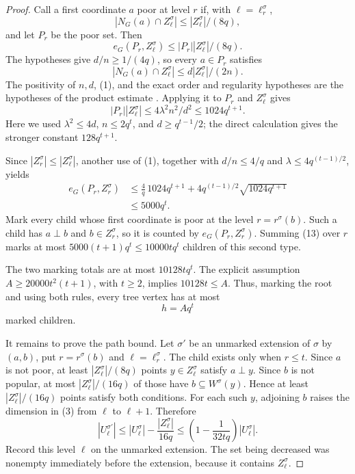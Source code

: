 \begin{proof}
Call a first coordinate $a$ poor at level $r$ if, with
$\ell=\ell_r^\sigma$,
\[
 |N_G(a)\cap Z_\ell^\sigma|
 \leq |Z_\ell^\sigma|/(8q),                                \tag{9}
\]
and let $P_r$ be the poor set.  Then
\[
 e_G(P_r,Z_\ell^\sigma)
 \leq |P_r||Z_\ell^\sigma|/(8q).                             \tag{10}
\]
The hypotheses give $d/n\geq1/(4q)$, so every $a\in P_r$ satisfies
\[
 |N_G(a)\cap Z_\ell^\sigma|
 \leq d|Z_\ell^\sigma|/(2n).                                \tag{11}
\]
The positivity of $n,d$, (1), and the exact order and regularity hypotheses
are the hypotheses of the product estimate .  Applying
it to $P_r$ and $Z_\ell^\sigma$ gives
\[
 |P_r||Z_\ell^\sigma|
 \leq4\lambda^2n^2/d^2\leq1024q^{t+1}.                     \tag{12}
\]
Here we used $\lambda^2\leq4d$, $n\leq2q^t$, and
$d\geq q^{t-1}/2$; the direct calculation gives the stronger constant
$128q^{t+1}$.

Since $|Z_r^\sigma|\leq|Z_\ell^\sigma|$, another use of (1), together with
$d/n\leq4/q$ and $\lambda\leq4q^{(t-1)/2}$, yields
\[
\begin{aligned}
 e_G(P_r,Z_r^\sigma)
 &\leq\frac4q\,1024q^{t+1}
   +4q^{(t-1)/2}\sqrt{1024q^{t+1}}\\
 &\leq5000q^t.                                               \tag{13}
\end{aligned}
\]
Mark every child whose first coordinate is poor at the level
$r=r^\sigma(b)$.  Such a child has $a\perp b$ and $b\in Z_r^\sigma$, so it
is counted by $e_G(P_r,Z_r^\sigma)$.  Summing (13) over $r$ marks at most
$5000(t+1)q^t\leq10000tq^t$ children of this second type.

The two marking totals are at most $10128tq^t$.  The explicit assumption
$A\geq20000t^2(t+1)$, with $t\geq2$, implies
$10128t\leq A$.  Thus, marking the root and using both rules, every tree
vertex has at most
\[
                              h=Aq^t                         \tag{14}
\]
marked children.

It remains to prove the path bound.  Let $\sigma'$ be an unmarked extension
of $\sigma$ by $(a,b)$, put $r=r^\sigma(b)$ and
$\ell=\ell_r^\sigma$.  The child exists only when $r\leq t$.  Since $a$ is
not poor, at least $|Z_\ell^\sigma|/(8q)$ points $y\in Z_\ell^\sigma$
satisfy $a\perp y$.  Since $b$ is not popular, at most
$|Z_\ell^\sigma|/(16q)$ of those have $b\subseteq W^\sigma(y)$.  Hence at
least $|Z_\ell^\sigma|/(16q)$ points satisfy both conditions.  For each such
$y$, adjoining $b$ raises the dimension in (3) from $\ell$ to $\ell+1$.
Therefore
\[
 |U_\ell^{\sigma'}|
 \leq |U_\ell^\sigma|-\frac{|Z_\ell^\sigma|}{16q}
 \leq\left(1-\frac1{32tq}\right)|U_\ell^\sigma|.            \tag{15}
\]
Record this level $\ell$ on the unmarked extension.  The set being decreased
was nonempty immediately before the extension, because it contains
$Z_\ell^\sigma$.


\end{proof}
